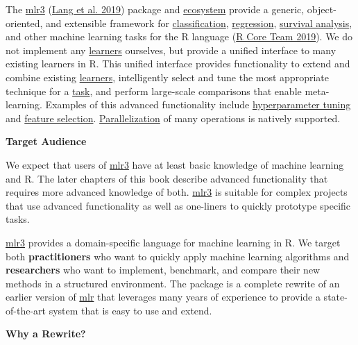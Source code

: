 \documentclass[
]{scrbook}
\begin{document}
The \href{https://mlr3.mlr-org.com}{mlr3} (\protect\hyperlink{ref-mlr3}{Lang et al. 2019}) package and \href{https://github.com/mlr-org/mlr3/wiki/Extension-Packages}{ecosystem} provide a generic, object-oriented, and extensible framework for \protect\hyperlink{tasks}{classification}, \protect\hyperlink{tasks}{regression}, \protect\hyperlink{survival}{survival analysis}, and other machine learning tasks for the R language (\protect\hyperlink{ref-R}{R Core Team 2019}).
We do not implement any \protect\hyperlink{learners}{learners} ourselves, but provide a unified interface to many existing learners in R.
This unified interface provides functionality to extend and combine existing \protect\hyperlink{learners}{learners}, intelligently select and tune the most appropriate technique for a \protect\hyperlink{tasks}{task}, and perform large-scale comparisons that enable meta-learning.
Examples of this advanced functionality include \protect\hyperlink{tuning}{hyperparameter tuning} and \protect\hyperlink{fs}{feature selection}. \protect\hyperlink{parallelization}{Parallelization} of many operations is natively supported.

\textbf{Target Audience}

We expect that users of \href{https://mlr3.mlr-org.com}{mlr3} have at least basic knowledge of machine learning and R.
The later chapters of this book describe advanced functionality that requires more advanced knowledge of both.
\href{https://mlr3.mlr-org.com}{mlr3} is suitable for complex projects that use advanced functionality as well as one-liners to quickly prototype specific tasks.

\href{https://mlr3.mlr-org.com}{mlr3} provides a domain-specific language for machine learning in R.
We target both \textbf{practitioners} who want to quickly apply machine learning algorithms and \textbf{researchers} who want to implement, benchmark, and compare their new methods in a structured environment.
The package is a complete rewrite of an earlier version of \href{https://mlr.mlr-org.com}{mlr} that leverages many years of experience to provide a state-of-the-art system that is easy to use and extend.

\textbf{Why a Rewrite?}
\end{document}
